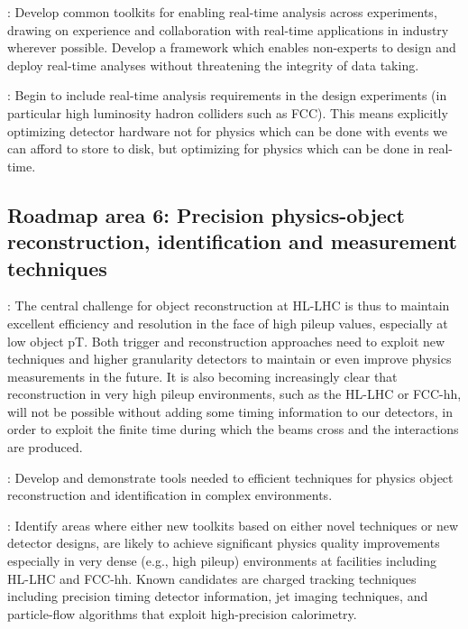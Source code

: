 \vskip 0.5cm
: Develop common toolkits for enabling real-time analysis across experiments, drawing on experience and collaboration with real-time applications in industry wherever possible. Develop a framework which enables non-experts to design and deploy real-time analyses without threatening the integrity of data taking.

\vskip 0.5cm
: Begin to include real-time analysis requirements in the design experiments (in particular high luminosity hadron colliders such as FCC). This means explicitly optimizing detector hardware not for physics which can be done with events we can afford to store to disk, but optimizing for physics which can be done in real-time.

\subsection{Roadmap area 6: Precision physics-object reconstruction, identification and measurement techniques}

: The central challenge for object reconstruction at HL-LHC is thus to maintain excellent efficiency and resolution in the face of high pileup values, especially at low object pT. Both trigger and reconstruction approaches need to exploit new techniques and higher granularity detectors to maintain or even improve physics measurements in the future.
It is also becoming increasingly clear that reconstruction in very high pileup environments, such as the HL-LHC or FCC-hh, will not be possible without adding some timing information to our detectors, in order to exploit the finite time during which the beams cross and the interactions are produced.

\vskip 0.5cm
: Develop and demonstrate tools needed to efficient techniques for physics object reconstruction and identification in complex environments.

\vskip 0.5cm
: Identify areas where either new toolkits based on either novel techniques or new detector designs, are likely to achieve significant physics quality improvements especially in very dense (e.g., high pileup) environments at facilities including HL-LHC and FCC-hh. Known candidates are charged tracking techniques including precision timing detector information, jet imaging techniques, and particle-flow algorithms that exploit high-precision calorimetry. 
 
